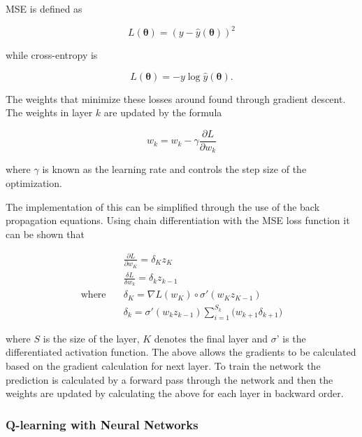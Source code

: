 MSE is defined as 

\begin{equation}
 L(\bm{\theta}) = (y - \hat{y}(\bm{\theta}))^2
\end{equation}

while cross-entropy is

\begin{equation}
 L(\bm{\theta}) = -y \log \hat{y}(\bm{\theta}).
\end{equation}

The weights that minimize these losses around found through gradient descent. The weights in layer $k$ are updated by the formula

\begin{equation}
 w_k = w_k - \gamma \frac{\partial{L}}{\partial{w_k}}
\end{equation}

where $\gamma$ is known as the learning rate and controls the step size of the optimization.

The implementation of this can be simplified through the use of the back propagation equations. Using chain differentiation with the MSE loss function it can be shown that 

\begin{equation}
    \begin{split}
        &\frac{\partial{L}}{\partial{w_K}} = \delta_K z_K \\
        &\frac{\delta{L}}{\delta{w_k}} = \delta_k z_{k-1}\\
        \text{where} \quad &\delta_K = \nabla L(w_K)\circ\sigma'(w_K z_{K-1})\\%
        & \delta_k = \sigma'(w_k z_{k-1}) \sum_{i=1}^{S_k}\big(w_{k+1}\delta_{k+1}\big)
    \end{split}
    \label{eq:backprop}
\end{equation}

where $S$ is the size of the layer, $K$ denotes the final layer and $\sigma$' is the differentiated activation function. The above allows the gradients to be calculated based on the gradient calculation for next layer. To train the network the prediction is calculated by a forward pass through the network and then the weights are updated by calculating the above for each layer in backward order. \citep[p.~ 392-396]{hastie_2009}

\subsubsection{Q-learning with Neural Networks}


